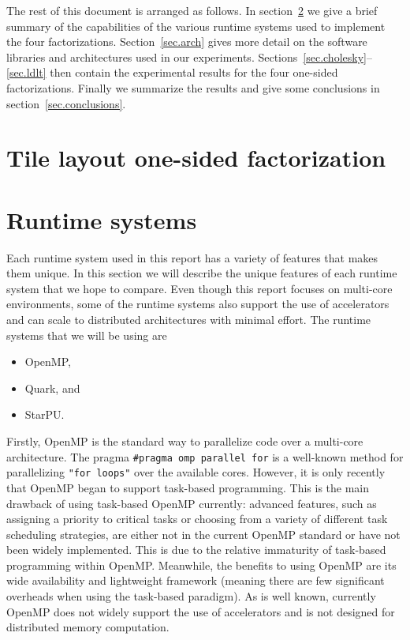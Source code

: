 \documentclass[a4paper,12pt]{article}
\begin{document}
The rest of this document is arranged as follows.
In section~\ref{sec.runtime_systems} we give a
brief summary of the capabilities of the various
runtime systems used to implement the four factorizations.
Section~\ref{sec.arch} gives more detail on the
software libraries and architectures used in our experiments.
Sections~\ref{sec.cholesky}--\ref{sec.ldlt} then
contain the experimental results for the four
one-sided factorizations.
Finally we summarize the results and give some conclusions
in section~\ref{sec.conclusions}.

\section{Tile layout one-sided factorization}
\label{sec.tile}




\section{Runtime systems}
\label{sec.runtime_systems}
Each runtime system used in this report has a variety of
features that makes them unique.
In this section we will describe the unique features of each runtime
system that we hope to compare.
Even though this report focuses on multi-core environments,
some of the runtime systems also support the use of accelerators
and can scale to distributed architectures with
minimal effort.
The runtime systems that we will be using are
\begin{itemize}
\item OpenMP,
\item Quark, and
\item StarPU.
\end{itemize}

Firstly, OpenMP is the standard way to parallelize code over a
multi-core architecture.  The pragma \texttt{\#pragma omp parallel
  for} is a well-known method for parallelizing \texttt{"for loops"}
over the available cores.  However, it is only recently that OpenMP
began to support task-based programming.  This is the main drawback of
using task-based OpenMP currently: advanced features, such as
assigning a priority to critical tasks or choosing from a variety of
different task scheduling strategies, are either not in the current
OpenMP standard or have not been widely implemented.  This is due to
the relative immaturity of task-based programming within OpenMP.
Meanwhile, the benefits to using OpenMP are its wide availability and
lightweight framework (meaning there are few significant overheads
when using the task-based paradigm).  As is well known, currently
OpenMP does not widely support the use of accelerators and is not
designed for distributed memory computation.
\end{document}
